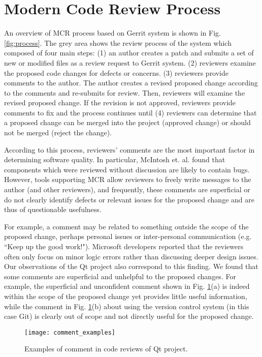 

\section{Modern Code Review Process}

An overview of MCR process based on Gerrit system is shown in Fig. \ref{fig:process}.
The grey area shows the review process of the system which composed of four main steps:
(1) an author creates a patch and submits a set of new or modified files as a review request to Gerrit system.
(2) reviewers examine the proposed code changes for defects or concerns.
(3) reviewers provide comments to the author. The author creates a revised proposed change according to the comments and re-submits for review. Then, reviewers will examine the revised proposed change. If the revision is not approved, reviewers provide comments to fix and the process continues until (4) reviewers can determine that a proposed change can be merged into the project (approved change) or should not be merged (reject the change). 


According to this process, reviewers' comments are the most important factor in determining software quality.
In particular, McIntosh et. al. \cite{Mcintosh} found that components which were reviewed without discussion are likely to contain bugs.
However, tools supporting MCR allow reviewers to freely write messages to the author (and other reviewers), and frequently, these comments are superficial or do not clearly identify defects or relevant issues for the proposed change and are thus of questionable usefulness.


For example, a comment may be related to something outside the scope of the proposed change, perhaps personal issues or inter-personal communication (e.g. ``Keep up the good work!").
Microsoft developers reported that the reviewers often only focus on minor logic errors rather than discussing deeper design\cite{Bacchelli2013a} issues.
Our observations of the Qt project also correspond to this finding.
We found that some comments are superficial and unhelpful to the proposed changes.
For example, the superficial and unconfident comment shown in Fig. \ref{fig:example}(a) is indeed within the scope of the proposed change yet provides little useful information,
while the comment in Fig. \ref{fig:example}(b) about using the version control system (in this case Git) is clearly out of scope and not directly useful for the proposed change. 



\begin{figure}[!t]
\centering
\texttt{[image: comment\_examples]}
\caption{Examples of comment in code reviews of Qt project.}
\label{fig:example}
\end{figure}
